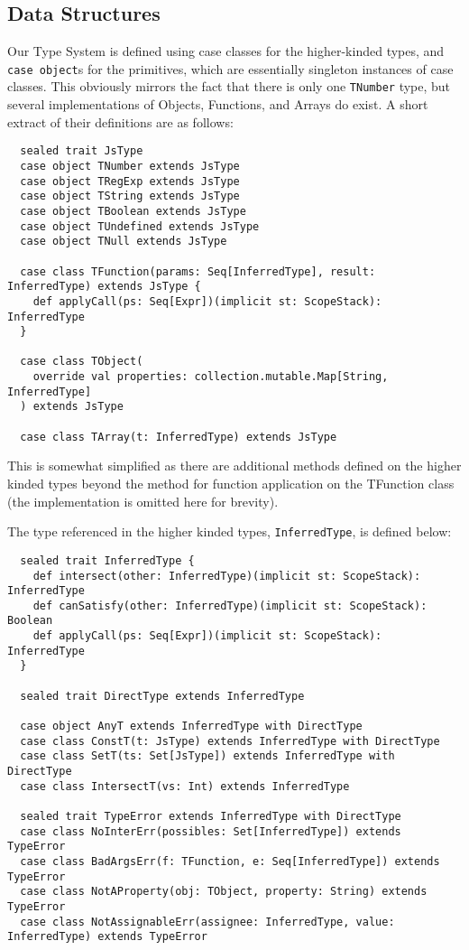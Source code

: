 \documentclass[british, twoside, openright]{bhamthesis}
\theoremstyle{definition}
\begin{document}
    \subsection{Data Structures}
      Our Type System is defined using case classes for the higher-kinded types, and \texttt{case object}s for the primitives, which are essentially singleton instances of case classes. This obviously mirrors the fact that there is only one \texttt{TNumber} type, but several implementations of Objects, Functions, and Arrays do exist. A short extract of their definitions are as follows:
      \begin{lstlisting}
  sealed trait JsType
  case object TNumber extends JsType
  case object TRegExp extends JsType
  case object TString extends JsType
  case object TBoolean extends JsType
  case object TUndefined extends JsType
  case object TNull extends JsType

  case class TFunction(params: Seq[InferredType], result: InferredType) extends JsType {
    def applyCall(ps: Seq[Expr])(implicit st: ScopeStack): InferredType
  }

  case class TObject(
    override val properties: collection.mutable.Map[String, InferredType]
  ) extends JsType

  case class TArray(t: InferredType) extends JsType
      \end{lstlisting}

      This is somewhat simplified as there are additional methods defined on the higher kinded types beyond the method for function application on the TFunction class (the implementation is omitted here for brevity).

      The type referenced in the higher kinded types, \texttt{InferredType}, is defined below:

      \begin{lstlisting}
  sealed trait InferredType {
    def intersect(other: InferredType)(implicit st: ScopeStack): InferredType
    def canSatisfy(other: InferredType)(implicit st: ScopeStack): Boolean
    def applyCall(ps: Seq[Expr])(implicit st: ScopeStack): InferredType
  }

  sealed trait DirectType extends InferredType

  case object AnyT extends InferredType with DirectType
  case class ConstT(t: JsType) extends InferredType with DirectType
  case class SetT(ts: Set[JsType]) extends InferredType with DirectType
  case class IntersectT(vs: Int) extends InferredType

  sealed trait TypeError extends InferredType with DirectType
  case class NoInterErr(possibles: Set[InferredType]) extends TypeError
  case class BadArgsErr(f: TFunction, e: Seq[InferredType]) extends TypeError
  case class NotAProperty(obj: TObject, property: String) extends TypeError
  case class NotAssignableErr(assignee: InferredType, value: InferredType) extends TypeError
      \end{lstlisting}
\end{document}
